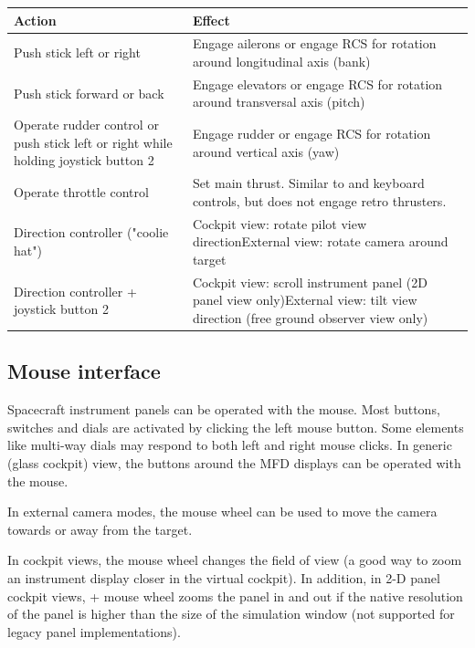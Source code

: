 \documentclass[Orbiter User Manual.tex]{subfiles}
\begin{document}
	\begin{longtable}{ >{\RaggedRight}p{}
		>{\RaggedRight}p{}  }
	\hline
	\textbf{Action} & \textbf{Effect}\\
	\hline
	Push stick left or right & Engage ailerons or engage RCS for rotation around
		longitudinal axis (bank)\\
	\hline
	Push stick forward or back & Engage elevators or engage RCS for rotation
		around transversal axis (pitch)\\
	\hline
	Operate rudder control or push stick left or right while holding joystick
		button 2 & Engage rudder or engage RCS for rotation around vertical axis
		(yaw)\\
	\hline
	Operate throttle control & Set main thrust. Similar to
		\keystroke{\ctrl,+}\num{} and \keystroke{\ctrl,-}\num{} keyboard
		controls, but does not engage retro thrusters.\\
	\hline
	Direction controller ("coolie hat") & Cockpit view: rotate pilot view
		direction\newline External view: rotate camera around target\\
	\hline
	Direction controller + joystick button 2 & Cockpit view: scroll instrument
		panel (2D panel view only)\newline External view: tilt view direction
		(free ground observer view only)\\
	\hline
	\end{longtable}


\subsection{Mouse interface}

Spacecraft instrument panels can be operated with the mouse. Most buttons,
switches and dials are activated by clicking the left mouse button. Some
elements like multi-way dials may respond to both left and right mouse clicks.
In generic (glass cockpit) view, the buttons around the MFD displays can be
operated with the mouse.

In external camera modes, the mouse wheel can be used to move the camera towards
or away from the target.

In cockpit views, the mouse wheel changes the field of view (a good way to zoom
an instrument display closer in the virtual cockpit). In addition, in 2-D panel
cockpit views, \Ctrl{} + mouse wheel zooms the panel in and out if the native
resolution of the panel is higher than the size of the simulation window (not
supported for legacy panel implementations).
\end{document}
